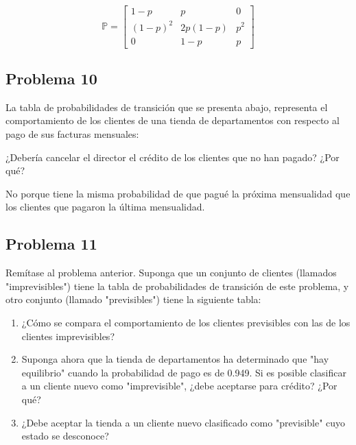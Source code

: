 \documentclass{article}
\begin{document}
            \begin{equation}
                \mathbb{P} = \begin{bmatrix}
                    1-p & p & 0 \\
                    (1-p)^{2} & 2p(1-p) & p^{2} \\
                    0 & 1-p & p
                \end{bmatrix}
            \end{equation}

        \subsection*{Problema 10}

            La tabla de probabilidades de transición que se presenta abajo, representa el comportamiento de los clientes de una tienda de departamentos con respecto al pago de sus facturas mensuales:

            ¿Debería cancelar el director el crédito de los clientes que no han pagado? ¿Por qué?

            No porque tiene la misma probabilidad de que pagué la próxima mensualidad que los clientes que pagaron la última mensualidad.

        \subsection*{Problema 11}

            Remítase al problema anterior. Suponga que un conjunto de clientes (llamados "imprevisibles") tiene la tabla de probabilidades de transición de este problema, y otro conjunto (llamado "previsibles") tiene la siguiente tabla:

            \begin{enumerate}
                \item  ¿Cómo se compara el comportamiento de los clientes previsibles con las de los 
                clientes imprevisibles?
                \item Suponga ahora que la tienda de departamentos ha determinado que "hay 
                equilibrio" cuando la probabilidad de pago es de 0.949. Si es posible clasificar 
                a un cliente nuevo como "imprevisible", ¿debe aceptarse para crédito? ¿Por 
                qué?
                \item ¿Debe aceptar la tienda a un cliente nuevo clasificado como "previsible" cuyo 
                estado se desconoce?
            \end{enumerate}
\end{document}
